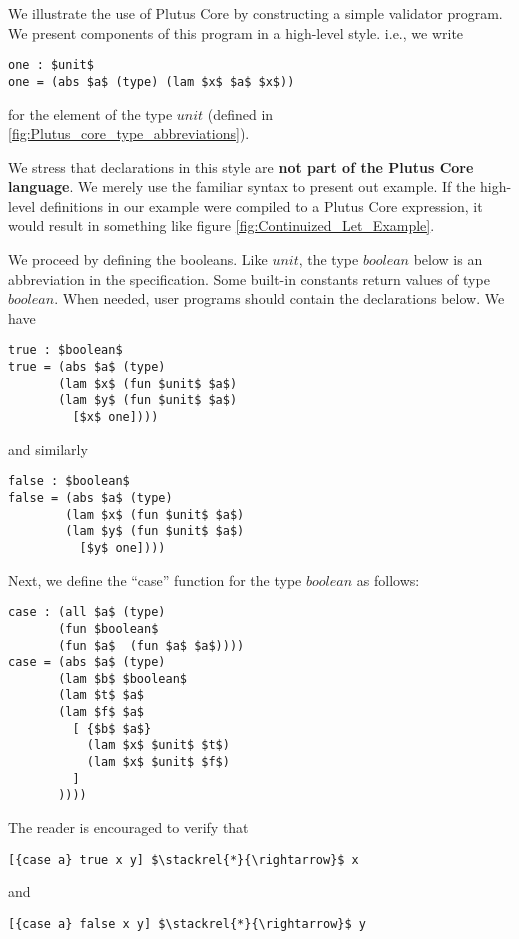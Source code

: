 \documentclass[../main.tex]{subfiles}
\begin{document}
We illustrate the use of Plutus Core by constructing a simple validator program. We present components of this program in a high-level style. i.e., we write
\begin{lstlisting}[basicstyle=\ttfamily,mathescape]
one : $unit$
one = (abs $a$ (type) (lam $x$ $a$ $x$))
\end{lstlisting}
for the element of the type $unit$ (defined in \ref{fig:Plutus_core_type_abbreviations}).

We stress that declarations in this style are \textbf{not part of the Plutus Core language}. We merely use the familiar syntax to present out example. If the high-level definitions in our example were compiled to a Plutus Core expression, it would result in something like figure \ref{fig:Continuized_Let_Example}.

We proceed by defining the booleans. Like $unit$, the type $boolean$ below is an abbreviation in the specification. Some built-in constants return values of type $boolean$. When needed, user programs should contain the declarations below. We have
\begin{lstlisting}[basicstyle=\ttfamily,mathescape]
true : $boolean$
true = (abs $a$ (type)
       (lam $x$ (fun $unit$ $a$)
       (lam $y$ (fun $unit$ $a$)
         [$x$ one])))
\end{lstlisting}
and similarly
\begin{lstlisting}[basicstyle=\ttfamily,mathescape]
false : $boolean$
false = (abs $a$ (type) 
        (lam $x$ (fun $unit$ $a$)
        (lam $y$ (fun $unit$ $a$)
          [$y$ one])))
\end{lstlisting}

Next, we define the ``case'' function for the type $boolean$ as follows:
\begin{lstlisting}[basicstyle=\ttfamily,mathescape]
case : (all $a$ (type)
       (fun $boolean$
       (fun $a$  (fun $a$ $a$))))
case = (abs $a$ (type)
       (lam $b$ $boolean$
       (lam $t$ $a$
       (lam $f$ $a$ 
         [ {$b$ $a$} 
           (lam $x$ $unit$ $t$)
           (lam $x$ $unit$ $f$)
         ]
       ))))
\end{lstlisting}
The reader is encouraged to verify that
\begin{lstlisting}[basicstyle=\ttfamily,mathescape]
[{case a} true x y] $\stackrel{*}{\rightarrow}$ x
\end{lstlisting}  
and
\begin{lstlisting}[basicstyle=\ttfamily,mathescape]
[{case a} false x y] $\stackrel{*}{\rightarrow}$ y
\end{lstlisting}  
\end{document}

